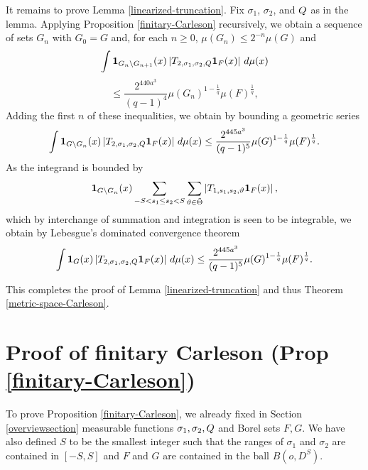 It remains to prove Lemma \ref{linearized-truncation}.
Fix $\sigma_1$, $\sigma_2$,
and ${Q}$ as in the lemma.
Applying Proposition \ref{finitary-Carleson} recursively, we obtain
a sequence of sets $G_n$ with $G_0=G$ and,
for each $n\ge 0$, $\mu(G_{n})\le 2^{-n} \mu(G)$ and
\begin{equation*}
    \int \mathbf{1}_{G_{n}\setminus G_{n+1}}(x)
    \left| {T}_{2,\sigma_1,\sigma_2, {Q}} \mathbf{1}_{F}(x) \right|\, d\mu(x)
\end{equation*}
\begin{equation}
    \le \frac{2^{440a^3}}{(q-1)^4} \mu(G_n)^{1 - \frac{1}{q}} \mu(F)^{\frac{1}{q}},
\end{equation}
Adding the first $n$ of these inequalities, we obtain by bounding a geometric series
    \begin{equation} \label{Sqcut2}
    \int \mathbf{1}_{G\setminus G_{n}}(x)
\left| {T}_{2,\sigma_1,\sigma_2, {Q}}\mathbf{1}_F(x) \right|\, d\mu(x)
\le \frac{2^{445a^3}}{(q-1)^5} \mu(G)^{1-\frac{1}{q}} \mu(F)^{\frac{1}{q}}.
\end{equation}
As the integrand is bounded by
\begin{equation}\mathbf{1}_{G\setminus G_{n}}(x)
\sum_{-S<s_1\le s_2<S}\sum_{{\vartheta}\in\tilde{{\Theta}}}
\left| {T}_{1,s_1, s_2, {\vartheta}} \mathbf{1}_{F}(x) \right|,
\end{equation}
which by interchange of summation and integration is seen to be integrable, we obtain by Lebesgue's dominated convergence theorem
 \begin{equation} \label{Sqcut3}
    \int \mathbf{1}_{G}(x)
\left| {T}_{2,\sigma_1,\sigma_2, {Q}}\mathbf{1}_F(x) \right|\, d\mu(x)
\le \frac{2^{445a^3}}{(q-1)^5} \mu(G)^{1-\frac{1}{q}} \mu(F)^{\frac{1}{q}}.
\end{equation}



This completes the proof of Lemma \ref{linearized-truncation}
and thus Theorem \ref{metric-space-Carleson}.

\chapter{Proof of finitary Carleson (Prop \ref{finitary-Carleson})}
\label{christsection}

To prove Proposition
\ref{finitary-Carleson}, we already fixed in Section \ref{overviewsection}
measurable functions ${\sigma_1},\sigma_2,  {Q}$ and Borel sets $F,G$. We have also
defined $S$ to be the smallest
integer such that the ranges of
$\sigma_1$ and $\sigma_2$ are contained in $[-S,S]$ and $F$ and $G$ are contained
in the ball $B(o, D^S)$.


